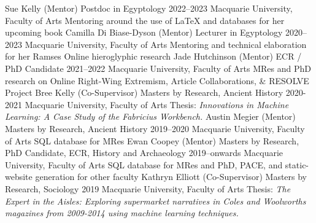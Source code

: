 \begin{cventries}
\cventry
    {Sue Kelly (Mentor)}
    {Postdoc in Egyptology}
    {2022--2023}
    {Macquarie University, Faculty of Arts}
    {Mentoring around the use of \LaTeX{} and databases for her upcoming book}
\cventry
    {Camilla Di Biase-Dyson (Mentor)}
    {Lecturer in Egyptology}
    {2020--2023}
    {Macquarie University, Faculty of Arts}
    {Mentoring and technical elaboration for her Ramses Online hieroglyphic research}
\cventry
    {Jade Hutchinson (Mentor)}
    {ECR / PhD Candidate}
    {2021--2022}
    {Macquarie University, Faculty of Arts}
    {MRes and PhD research on Online Right-Wing Extremism, Article Collaborations, \& RESOLVE Project}
\cventry
    {Bree Kelly (Co-Supervisor)}
    {Masters by Research, Ancient History}
    {2020-2021}
    {Macquarie University, Faculty of Arts}
    {Thesis: \textit{Innovations in Machine Learning: A Case Study of the Fabricius Workbench.}}
\cventry
    {Austin Megier (Mentor)}
    {Masters by Research, Ancient History}
    {2019--2020}
    {Macquarie University, Faculty of Arts}
    {SQL database for MRes}
\cventry
    {Ewan Coopey (Mentor)}
    {Masters by Research, PhD Candidate, ECR, History and Archaeology}
    {2019--onwards}
    {Macquarie University, Faculty of Arts}
    {SQL database for MRes and PhD, PACE, and static-website generation for other faculty}        
\cventry
    {Kathryn Elliott (Co-Supervisor)}
    {Masters by Research, Sociology}
    {2019}
    {Macquarie University, Faculty of Arts}
    {Thesis: \textit{The Expert in the Aisles: Exploring
supermarket narratives in Coles and Woolworths magazines from 2009-2014 using machine learning techniques.}}
    
\end{cventries}





